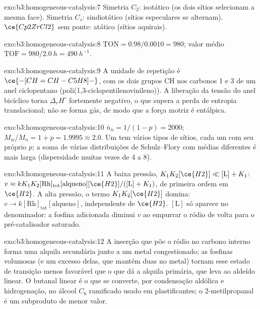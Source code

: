 \begin{solution}{exo:b3:homogeneous-catalysis:7}
Simetria $C_2$: isotático (os dois sítios selecionam a mesma face). Simetria $C_s$:
sindiotático (sítios especulares se alternam). $\ce{Cp2ZrCl2}$ sem ponte: atático (sítios
aquirais).
\end{solution}

\begin{solution}{exo:b3:homogeneous-catalysis:8}
$\mathrm{TON} = 0.98/0.0010 = 980$; valor médio $\mathrm{TOF} = 980/\qty{2.0}{h} = \qty{490}{h^{-1}}$.
\end{solution}

\begin{solution}{exo:b3:homogeneous-catalysis:9}
A unidade de repetição é $\ce{-[CH=CH-C5H8]-}$, com os dois grupos CH nos carbonos 1 e 3 de um
anel ciclopentano (poli(1,3-ciclopentilenovinileno)). A liberação da
tensão do anel bicíclico torna $\Delta_rH^\circ$ fortemente negativo, o que supera a
perda de entropia translacional; não se forma gás, de modo que a força motriz é
entálpica.
\end{solution}

\begin{solution}{exo:b3:homogeneous-catalysis:10}
$\bar n_n = 1/(1 - p) = 2000$; $M_w/M_n = 1 + p = 1.9995 \approx 2.0$. Um  tem
vários tipos de sítios, cada um com seu próprio $p$; a soma de várias distribuições de Schulz--Flory
com médias diferentes é mais larga (dispersidade muitas vezes de 4 a 8).
\end{solution}

\begin{solution}{exo:b3:homogeneous-catalysis:11}
A baixa pressão, $K_1K_2[\ce{H2}] \ll [\mathrm L] + K_1$: $v \approx kK_1K_2[\mathrm{Rh}]_{\mathrm{tot}}[\text{alqueno}][\ce{H2}]/([\mathrm L] + K_1)$,
de primeira ordem em $\ce{H2}$. A alta pressão, o termo $K_1K_2[\ce{H2}]$ domina: $v \to k[\mathrm{Rh}]_{\mathrm{tot}}[\text{alqueno}]$,
independente de $\ce{H2}$. $[\mathrm L]$ só aparece no denominador: a fosfina adicionada diminui $v$
ao empurrar o ródio de volta para o pré-catalisador saturado.
\end{solution}

\begin{solution}{exo:b3:homogeneous-catalysis:12}
A inserção que põe o ródio no carbono interno forma uma alquila secundária
junto a um metal congestionado; as fosfinas volumosas (e um excesso delas, que mantém duas
no metal) tornam esse estado de transição menos favorável que o que dá a alquila
primária, que leva ao aldeído linear. O butanal linear é o que se converte, por
condensação aldólica e hidrogenação, no álcool $C_8$ ramificado usado em
plastificantes; o 2-metilpropanal é um subproduto de menor valor.
\end{solution}

